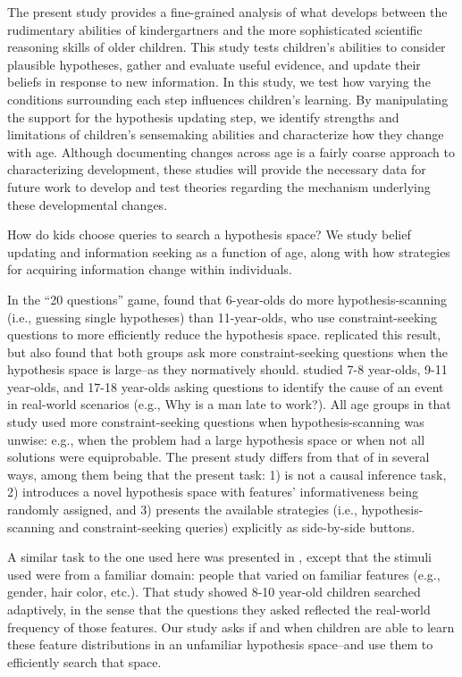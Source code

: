 \documentclass[10pt,letterpaper]{article}
\begin{document}
The present study provides a fine-grained analysis of what develops between the rudimentary abilities of kindergartners and the more sophisticated scientific reasoning skills of older children. This study tests children's abilities to consider plausible hypotheses, gather and evaluate useful evidence, and update their beliefs in response to new information. In this study, we test how varying the conditions surrounding each step influences children's learning. By manipulating the support for the hypothesis updating step, we identify strengths and limitations of children's sensemaking abilities and characterize how they change with age. Although documenting changes across age is a fairly coarse approach to characterizing development, these studies will provide the necessary data for future work to develop and test theories regarding the mechanism underlying these developmental changes.

How do kids choose queries to search a hypothesis space? We study belief updating and information seeking as a function of age, along with how strategies for acquiring information change within individuals.

In the ``20 questions'' game,  found that 6-year-olds do more hypothesis-scanning (i.e., guessing single hypotheses) than 11-year-olds, who use constraint-seeking questions to more efficiently reduce the hypothesis space.  replicated this result, but also found that both groups ask more constraint-seeking questions when the hypothesis space is large--as they normatively should.  studied 7-8 year-olds, 9-11 year-olds, and 17-18 year-olds asking questions to identify the cause of an event in real-world scenarios (e.g., Why is a man late to work?). All age groups in that study used more constraint-seeking questions when hypothesis-scanning was unwise: e.g., when the problem had a large hypothesis space or when not all solutions were equiprobable. The present study differs from that of  in several ways, among them being that the present task: 1) is not a causal inference task, 2) introduces a novel hypothesis space with features' informativeness being randomly assigned, and 3) presents the available strategies (i.e., hypothesis-scanning and constraint-seeking queries) explicitly as side-by-side buttons.

A similar task to the one used here was presented in , except that the stimuli used were from a familiar domain: people that varied on familiar features (e.g., gender, hair color, etc.). That study showed 8-10 year-old children searched adaptively, in the sense that the questions they asked reflected the real-world frequency of those features. Our study asks if and when children are able to learn these feature distributions in an unfamiliar hypothesis space--and use them to efficiently search that space.
\end{document}
